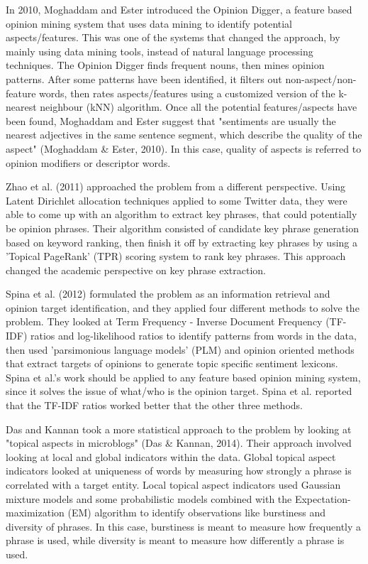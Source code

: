 \documentclass{sig-alternate}
\begin{document}
In 2010, Moghaddam and Ester introduced the Opinion Digger, a feature based opinion mining system that uses data mining to identify potential aspects/features. This was one of the systems that changed the approach, by mainly using data mining tools, instead of natural language processing techniques. The Opinion Digger finds frequent nouns, then mines opinion patterns. After some patterns have been identified, it filters out non-aspect/non-feature words, then rates aspects/features using a customized version of the k-nearest neighbour (kNN) algorithm. Once all the potential features/aspects have been found, Moghaddam and Ester suggest that "sentiments are usually the nearest adjectives in the same sentence segment, which describe the quality of the aspect" (Moghaddam \& Ester, 2010). In this case, quality of aspects is referred to opinion modifiers or descriptor words.

Zhao et al. (2011) approached the problem from a different perspective. Using Latent Dirichlet allocation techniques applied to some Twitter data, they were able to come up with an algorithm to extract key phrases, that could potentially be opinion phrases. Their algorithm consisted of candidate key phrase generation based on keyword ranking, then finish it off by extracting key phrases by using a 'Topical PageRank' (TPR) scoring system to rank key phrases. This approach changed the academic perspective on key phrase extraction.

Spina et al. (2012) formulated the problem as an information retrieval and opinion target identification, and they applied four different methods to solve the problem. They looked at Term Frequency - Inverse Document Frequency (TF-IDF) ratios and log-likelihood ratios to identify patterns from words in the data, then used 'parsimonious language models' (PLM) and opinion oriented methods that extract targets of opinions to generate topic specific sentiment lexicons. Spina et al.'s work should be applied to any feature based opinion mining system, since it solves the issue of what/who is the opinion target. Spina et al. reported that the TF-IDF ratios worked better that the other three methods.

Das and Kannan took a more statistical approach to the problem by looking at "topical aspects in microblogs" (Das \& Kannan, 2014). Their approach involved looking at local and global indicators within the data. Global topical aspect indicators looked at uniqueness of words by measuring how strongly a phrase is correlated with a target entity. Local topical aspect indicators used Gaussian mixture models and some probabilistic models combined with the Expectation-maximization (EM) algorithm to identify observations like burstiness and diversity of phrases. In this case, burstiness is meant to measure how frequently a phrase is used, while diversity is meant to measure how differently a phrase is used.
\end{document}
